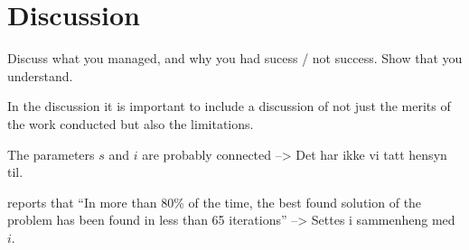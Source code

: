 \section{Discussion}

Discuss what you managed, and why you had sucess / not success. 
Show that you understand.

In the discussion it is important to include a discussion of not just the merits of the work conducted but also the limitations. 

The parameters $s$ and $i$ are probably connected --> Det har ikke vi tatt hensyn til. 

\citet{poorzahedy11} reports that ``In more than 80\% of the time, the best found solution of the problem has been found in less than 65 iterations'' --> Settes i sammenheng med $i$.


